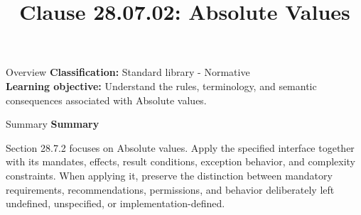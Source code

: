 \documentclass[10pt,letterpaper]{article}
\title{Clause 28.07.02: Absolute Values}
\author{}
\date{}
\begin{document}
\maketitle
\begin{CornellOverviewBox}{Overview}
\textbf{Classification:} Standard library - Normative\\[2pt]
\textbf{Learning objective:} Understand the rules, terminology, and semantic consequences associated with Absolute values.
\end{CornellOverviewBox}\begin{CornellSummaryBox}{Summary}
{\sffamily\bfseries\color{Accent} Summary}\par\vspace{3pt}Section 28.7.2 focuses on Absolute values. Apply the specified interface together with its mandates, effects, result conditions, exception behavior, and complexity constraints. When applying it, preserve the distinction between mandatory requirements, recommendations, permissions, and behavior deliberately left undefined, unspecified, or implementation-defined.
\end{CornellSummaryBox}
\end{document}
